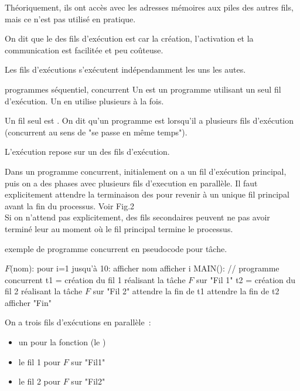 \begin{adjustwidth}{-3cm}{-3cm}
Théoriquement, ils ont accès avec les adresses mémoires aux piles des autres fils, mais ce n'est pas utilisé en pratique.

On dit que le  des fils d'exécution est  car la création, l'activation et la communication est facilitée et peu coûteuse.

Les fils d'exécutions s'exécutent indépendamment les uns les autes.

\begin{definition}{}{programmes séquentiel, concurrent}
    Un  est un programme utilisant un seul fil d'exécution. Un  en utilise plusieurs à la fois.
\end{definition}

Un fil seul est . On dit qu'un programme est  lorsqu'il a plusieurs fils d'exécution (concurrent au sens de "se passe en même temps").

L'exécution repose sur un   des fils d'exécution.

Dans un programme concurrent, initialement on a un fil d'exécution principal, puis on a des phases avec plusieurs fils d'execution en parallèle. Il faut explicitement attendre la terminaison des  pour revenir à un unique fil principal avant la fin du processus. Voir Fig.2 \\
Si on n'attend pas explicitement, des fils secondaires peuvent ne pas avoir terminé leur  au moment où le fil principal termine le processus.

\begin{implementation}{exemple de programme concurrent en pseudocode}
     pour tâche.
    \begin{lstLNat}
    $F$(nom):
        pour i=1 jusqu'à 10:
            afficher nom
            afficher i
    MAIN(): // programme concurrent
        t1 = création du fil 1 réalisant la tâche $F$ sur "Fil 1"
        t2 = création du fil 2 réalisant la tâche $F$ sur "Fil 2"
        attendre la fin de t1
        attendre la fin de t2
        afficher "Fin"
    \end{lstLNat}
    On a trois fils d'exécutions en parallèle~:
    \begin{itemize}
        \item un pour la fonction  (le )
        \item le fil 1 pour $F$ sur "Fil1"
        \item le fil 2 pour $F$ sur "Fil2"
    \end{itemize}
\end{implementation}


\end{adjustwidth}
